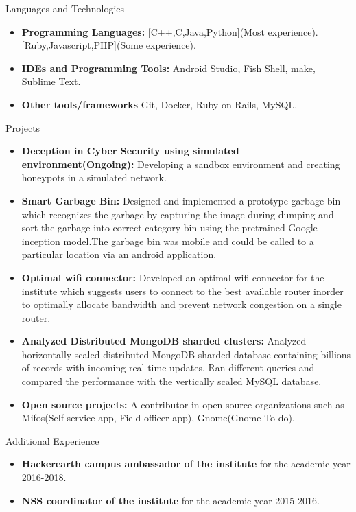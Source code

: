 \documentclass[]{mcdowellcv}
\begin{document}
	
	\begin{cvsection}{Languages and Technologies}
	\bigbreak
			\begin{itemize}
				\item \textbf{Programming Languages:} [C++,C,Java,Python](Most experience). [Ruby,Javascript,PHP](Some experience).
				\item \textbf{IDEs and Programming Tools:} Android Studio, Fish Shell, make, Sublime Text.
				\item \textbf{Other tools/frameworks} Git, Docker, Ruby on Rails, MySQL.
			\end{itemize}

	\end{cvsection}
	
	\begin{cvsection}{Projects}
	\bigbreak
		\begin{cvsubsection}{}{}{}	
			\begin{itemize}
				\item \textbf{Deception in Cyber Security using simulated environment(Ongoing):} Developing a sandbox environment and creating honeypots in a simulated network.
				\item \textbf{Smart Garbage Bin:} Designed and implemented a prototype garbage bin which recognizes the garbage by capturing the image during dumping and sort the garbage into correct category bin using the pretrained Google inception model.The garbage bin was mobile and could be called to a particular location via an android application.
	\item \textbf{Optimal wifi connector:} Developed an optimal wifi connector for the institute which suggests users to connect to the best available router inorder to optimally allocate bandwidth and prevent network congestion on a single router.
	\item \textbf{Analyzed Distributed MongoDB sharded clusters:} Analyzed horizontally scaled distributed MongoDB sharded database containing billions of records with incoming real-time updates. Ran different queries and compared the performance with the vertically scaled MySQL database.
	\item \textbf{Open source projects:} A contributor in open source organizations such as Mifos(Self service app, Field officer app), Gnome(Gnome To-do).
			\end{itemize}
		\end{cvsubsection}
	\end{cvsection}
	
	\begin{cvsection}{Additional Experience}
	\bigbreak
		\begin{cvsubsection}{}{}{}	
		
			\begin{itemize}
				\item \textbf{Hackerearth campus ambassador of the institute} for the academic year 2016-2018. 
				\item \textbf{NSS coordinator of the institute} for the academic year 2015-2016.
			\end{itemize}
		\end{cvsubsection}
	\end{cvsection}
	
\end{document}
